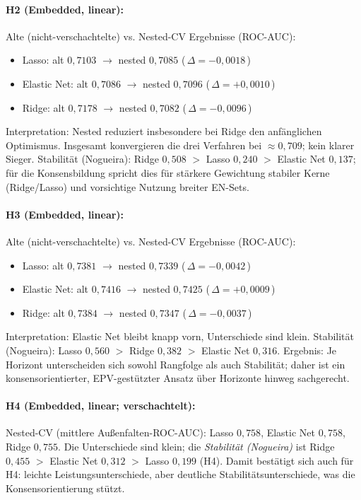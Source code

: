 \paragraph{H2 (Embedded, linear):}
Alte (nicht-verschachtelte) vs. Nested-CV Ergebnisse (ROC-AUC):
\begin{itemize}
  \item Lasso: alt $0{,}7103$ \;$\rightarrow$\; nested $0{,}7085$ (\,$\Delta=-0{,}0018$\,)
  \item Elastic Net: alt $0{,}7086$ \;$\rightarrow$\; nested $0{,}7096$ (\,$\Delta=+0{,}0010$\,)
  \item Ridge: alt $0{,}7178$ \;$\rightarrow$\; nested $0{,}7082$ (\,$\Delta=-0{,}0096$\,)
\end{itemize}
Interpretation: Nested reduziert insbesondere bei Ridge den anfänglichen Optimismus. Insgesamt konvergieren die drei Verfahren bei $\approx 0{,}709$; kein klarer Sieger. Stabilität (Nogueira): Ridge $0{,}508$ $>$ Lasso $0{,}240$ $>$ Elastic Net $0{,}137$; für die Konsensbildung spricht dies für stärkere Gewichtung stabiler Kerne (Ridge/Lasso) und vorsichtige Nutzung breiter EN-Sets.

\paragraph{H3 (Embedded, linear):}
Alte (nicht-verschachtelte) vs. Nested-CV Ergebnisse (ROC-AUC):
\begin{itemize}
  \item Lasso: alt $0{,}7381$ \;$\rightarrow$\; nested $0{,}7339$ (\,$\Delta=-0{,}0042$\,)
  \item Elastic Net: alt $0{,}7416$ \;$\rightarrow$\; nested $0{,}7425$ (\,$\Delta=+0{,}0009$\,)
  \item Ridge: alt $0{,}7384$ \;$\rightarrow$\; nested $0{,}7347$ (\,$\Delta=-0{,}0037$\,)
\end{itemize}
Interpretation: Elastic Net bleibt knapp vorn, Unterschiede sind klein. Stabilität (Nogueira): Lasso $0{,}560$ $>$ Ridge $0{,}382$ $>$ Elastic Net $0{,}316$. Ergebnis: Je Horizont unterscheiden sich sowohl Rangfolge als auch Stabilität; daher ist ein konsensorientierter, EPV-gestützter Ansatz über Horizonte hinweg sachgerecht.

\paragraph{H4 (Embedded, linear; verschachtelt):}
Nested-CV (mittlere Außenfalten-ROC-AUC): Lasso $0{,}758$, Elastic Net $0{,}758$, Ridge $0{,}755$. Die Unterschiede sind klein; die \emph{Stabilität (Nogueira)} ist Ridge $0{,}455$ $>$ Elastic Net $0{,}312$ $>$ Lasso $0{,}199$ (H4). Damit bestätigt sich auch für H4: leichte Leistungsunterschiede, aber deutliche Stabilitätsunterschiede, was die Konsensorientierung stützt.

